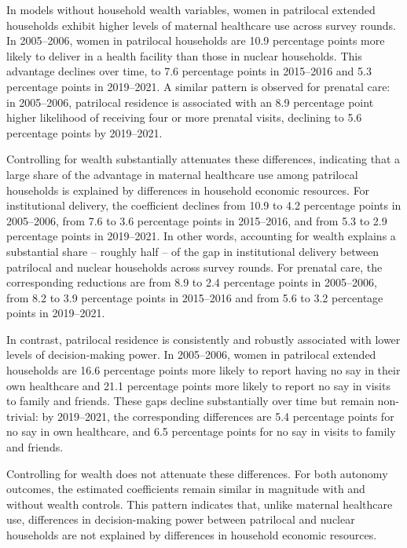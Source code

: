 \documentclass[12pt]{article}
\begin{document}
In models without household wealth variables, women in patrilocal extended households exhibit higher levels of maternal healthcare use across survey rounds. In 2005–2006, women in patrilocal households are 10.9 percentage points more likely to deliver in a health facility than those in nuclear households. This advantage declines over time, to 7.6 percentage points in 2015–2016 and 5.3 percentage points in 2019–2021. A similar pattern is observed for prenatal care: in 2005–2006, patrilocal residence is associated with an 8.9 percentage point higher likelihood of receiving four or more prenatal visits, declining to 5.6 percentage points by 2019–2021.

Controlling for wealth substantially attenuates these differences, indicating that a large share of the advantage in maternal healthcare use among patrilocal households is explained by differences in household economic resources. For institutional delivery, the coefficient declines from 10.9 to 4.2 percentage points in 2005–2006, from 7.6 to 3.6 percentage points in 2015–2016, and from 5.3 to 2.9 percentage points in 2019–2021. In other words, accounting for wealth explains a substantial share – roughly half – of the gap in institutional delivery between patrilocal and nuclear households across survey rounds. For prenatal care, the corresponding reductions are from 8.9 to 2.4 percentage points in 2005–2006, from 8.2 to 3.9 percentage points in 2015–2016 and from 5.6 to 3.2 percentage points in 2019–2021.

In contrast, patrilocal residence is consistently and robustly associated with lower levels of decision-making power. In 2005–2006, women in patrilocal extended households are 16.6 percentage points more likely to report having no say in their own healthcare and 21.1 percentage points more likely to report no say in visits to family and friends. These gaps decline substantially over time but remain non-trivial: by 2019–2021, the corresponding differences are 5.4 percentage points for no say in own healthcare, and 6.5 percentage points for no say in visits to family and friends. 

Controlling for wealth does not attenuate these differences. For both autonomy outcomes, the estimated coefficients remain similar in magnitude with and without wealth controls. This pattern indicates that, unlike maternal healthcare use, differences in decision-making power between patrilocal and nuclear households are not explained by differences in household economic resources.
\end{document}
